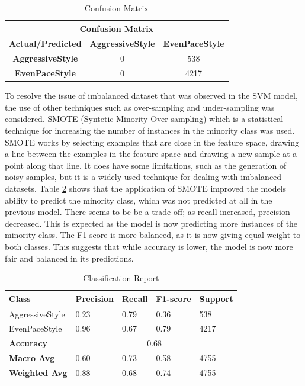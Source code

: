 \begin{table}[H]
    \centering
    \begin{tabular}{|c|c|c|}
    \hline
    \multicolumn{3}{|c|}{\textbf{Confusion Matrix}} \\
    \hline
    \textbf{Actual/Predicted} & \textbf{AggressiveStyle} & \textbf{EvenPaceStyle} \\ \hline
    \textbf{AggressiveStyle} & 0 & 538 \\ \hline
    \textbf{EvenPaceStyle} & 0 & 4217 \\ \hline
    \end{tabular}
    \caption{Confusion Matrix}
    \label{table:confusion_matrix}
\end{table}

To resolve the issue of imbalanced dataset that was observed in the SVM model, the use of other techniques such as over-sampling and under-sampling was considered.
SMOTE (Syntetic Minority Over-sampling) which is a statistical technique for increasing the number of instances in the minority class was used. SMOTE works by selecting
examples that are close in the feature space, drawing a line between the examples in the feature space and drawing a new sample at a point along that line. 
It does have some limitations, such as the generation of noisy samples, but it is a widely used technique for dealing with imbalanced datasets. \cite{fernandez2018smote} 
Table \ref{table:classification_report_smote} shows that the application of SMOTE improved the models ability to predict the minority class, which was not predicted at all 
in the previous model. There seems to be be a trade-off; as recall increased, precision decreased. This is expected as the model is now predicting more instances of the minority class.
The F1-score is more balanced, as it is now giving equal weight to both classes. This suggests that while accuracy is lower, the model is now more fair and balanced in its predictions.

\begin{table}[H]
    \centering    
    \begin{tabular}{|l|l|l|l|l|}
    \hline
    \textbf{Class} & \textbf{Precision} & \textbf{Recall} & \textbf{F1-score} & \textbf{Support} \\ \hline
    AggressiveStyle & 0.23 & 0.79 & 0.36 & 538 \\ \hline
    EvenPaceStyle & 0.96 & 0.67 & 0.79 & 4217 \\ \hline
    \textbf{Accuracy} & \multicolumn{4}{c|}{0.68} \\ \hline
    \textbf{Macro Avg} & 0.60 & 0.73 & 0.58 & 4755 \\ \hline
    \textbf{Weighted Avg} & 0.88 & 0.68 & 0.74 & 4755 \\ \hline
    \end{tabular}
    \caption{Classification Report}
    \label{table:classification_report_smote}
\end{table}

